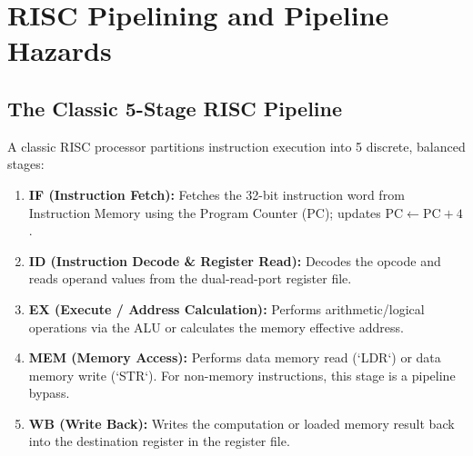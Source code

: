 \documentclass[12pt,a4paper]{article}
\begin{document}
\section{RISC Pipelining and Pipeline Hazards}

\subsection{The Classic 5-Stage RISC Pipeline}
A classic RISC processor partitions instruction execution into 5 discrete, balanced stages:
\begin{enumerate}[leftmargin=*]
  \item \textbf{IF (Instruction Fetch):} Fetches the 32-bit instruction word from Instruction Memory using the Program Counter ($\mathrm{PC}$); updates $\mathrm{PC} \leftarrow \mathrm{PC} + 4$.
  \item \textbf{ID (Instruction Decode \& Register Read):} Decodes the opcode and reads operand values from the dual-read-port register file.
  \item \textbf{EX (Execute / Address Calculation):} Performs arithmetic/logical operations via the ALU or calculates the memory effective address.
  \item \textbf{MEM (Memory Access):} Performs data memory read (`LDR`) or data memory write (`STR`). For non-memory instructions, this stage is a pipeline bypass.
  \item \textbf{WB (Write Back):} Writes the computation or loaded memory result back into the destination register in the register file.
\end{enumerate}

\begin{tcolorbox}[tikzbox, title={Execution Flow Across 5-Stage RISC Pipeline}]
\centering
{}
\end{tcolorbox}
\end{document}
